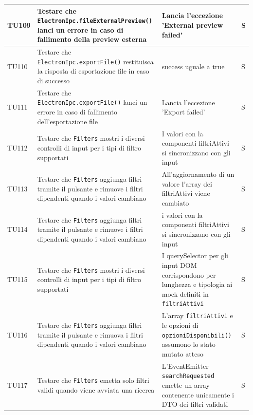 \documentclass[a4paper,12pt]{article}
\begin{document}
\begin{longtable}{|M{1.2cm}|M{5cm}|M{7cm}|M{1.5cm}|}
            TU109 & Testare che \texttt{ElectronIpc.fileExternalPreview()} lanci un errore in caso di fallimento della preview esterna & Lancia l'eccezione 'External preview failed' & S \\
            \hline

            TU110 & Testare che \texttt{ElectronIpc.exportFile()} restituisca la risposta di esportazione file in caso di successo & success uguale a true & S \\
            \hline

            TU111 & Testare che \texttt{ElectronIpc.exportFile()} lanci un errore in caso di fallimento dell'esportazione file & Lancia l'eccezione 'Export failed' & S \\
            \hline

            TU112 & Testare che \texttt{Filters} mostri i diversi controlli di input per i tipi di filtro supportati & I valori con la componenti filtriAttivi si sincronizzano con gli input & S \\
            \hline

            TU113 & Testare che \texttt{Filters} aggiunga filtri tramite il pulsante e rimuove i filtri dipendenti quando i valori cambiano & All'aggiornamento di un valore l'array dei filtriAttivi viene cambiato & S \\
            \hline

            TU114 & Testare che \texttt{Filters} aggiunga filtri tramite il pulsante e rimuove i filtri dipendenti quando i valori cambiano & i valori con la componenti filtriAttivi si sincronizzano con gli input & S \\
            \hline

            TU115 & Testare che \texttt{Filters} mostri i diversi controlli di input per i tipi di filtro supportati & I querySelector per gli input DOM corrispondono per lunghezza e tipologia ai mock definiti in \texttt{filtriAttivi} & S \\ 
            \hline
            
            TU116 & Testare che \texttt{Filters} aggiunga filtri tramite il pulsante e rimuova i filtri dipendenti quando i valori cambiano & L'array \texttt{filtriAttivi} e le opzioni di \texttt{opzioniDisponibili()} assumono lo stato mutato atteso & S \\ 
            \hline
            
            TU117 & Testare che \texttt{Filters} emetta solo filtri validi quando viene avviata una ricerca & L'EventEmitter \texttt{searchRequested} emette un array contenente unicamente i DTO dei filtri validati & S \\ 
            \hline
            

\end{longtable}
\end{document}
